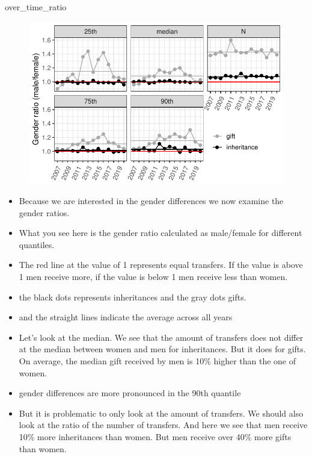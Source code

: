 \documentclass[
  letterpaper,
  DIV=11,
  numbers=noendperiod]{scrartcl}
\newenvironment{Shaded}{\begin{snugshade}}{\end{snugshade}}
\newcommand{\NormalTok}[1]{\textcolor[rgb]{0.00,0.23,0.31}{#1}}
\providecommand{\tightlist}{%
  \setlength{\itemsep}{0pt}\setlength{\parskip}{0pt}}\usepackage{longtable,booktabs,array}
\begin{document}
\begin{Shaded}
\begin{Highlighting}[]
\NormalTok{over\_time\_ratio}
\end{Highlighting}
\end{Shaded}

\begin{figure}[H]

{\centering \includegraphics{dgs_files/figure-pdf/unnamed-chunk-2-1.pdf}

}

\end{figure}

\begin{itemize}
\tightlist
\item
  Because we are interested in the gender differences we now examine the
  gender ratios.
\item
  What you see here is the gender ratio calculated as male/female for
  different quantiles.
\item
  The red line at the value of 1 represents equal transfers. If the
  value is above 1 men receive more, if the value is below 1 men receive
  less than women.
\item
  the black dots represents inheritances and the gray dots gifts.
\item
  and the straight lines indicate the average across all years
\item
  Let's look at the median. We see that the amount of transfers does not
  differ at the median between women and men for inheritances. But it
  does for gifts. On average, the median gift received by men is 10\%
  higher than the one of women.
\item
  gender differences are more pronounced in the 90th quantile
\item
  But it is problematic to only look at the amount of transfers. We
  should also look at the ratio of the number of transfers. And here we
  see that men receive 10\% more inheritances than women. But men
  receive over 40\% more gifts than women.
\end{itemize}
\end{document}
